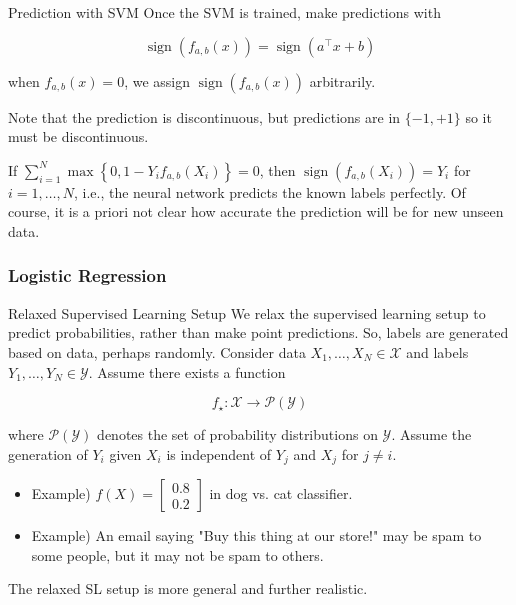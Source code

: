 \begin{frame}[allowframebreaks]

\begin{myconceptblock}{3.7}{Prediction with SVM}
    Once the SVM is trained, make predictions with

    $$
    \operatorname{sign}\left(f_{a, b}(x)\right)=\operatorname{sign}\left(a^{\top} x+b\right)
    $$

    when $f_{a, b}(x)=0$, we assign $\operatorname{sign}\left(f_{a, b}(x)\right)$ arbitrarily.

    Note that the prediction is discontinuous, but predictions are in $\{-1,+1\}$ so it must be discontinuous.

    If $\sum_{i=1}^{N} \max \left\{0,1-Y_{i} f_{a, b}\left(X_{i}\right)\right\}=0$, then $\operatorname{sign}\left(f_{a, b}\left(X_{i}\right)\right)=Y_{i}$ for $i=1, \ldots, N$, i.e., the neural network predicts the known labels perfectly.
    Of course, it is a priori not clear how accurate the prediction will be for new unseen data.
\end{myconceptblock}

\end{frame}

\subsubsection{Logistic Regression}

\begin{frame}[allowframebreaks]

\begin{myconceptblock}{3.8}{Relaxed Supervised Learning Setup}
    We relax the supervised learning setup to predict probabilities, rather than make point predictions.
    So, labels are generated based on data, perhaps randomly.
    Consider data $X_{1}, \ldots, X_{N} \in \mathcal{X}$ and labels $Y_{1}, \ldots, Y_{N} \in \mathcal{Y}$. Assume there exists a function

    $$
    f_{\star}: \mathcal{X} \rightarrow \mathcal{P}(\mathcal{Y})
    $$

    where $\mathcal{P}(\mathcal{Y})$ denotes the set of probability distributions on $\mathcal{Y}$.
    Assume the generation of $Y_{i}$ given $X_{i}$ is independent of $Y_{j}$ and $X_{j}$ for $j \neq i$.

    \begin{itemize}
        \item Example) $f(X)=\left[\begin{array}{l}0.8 \\ 0.2\end{array}\right]$ in dog vs. cat classifier.
        \item Example) An email saying "Buy this thing at our store!" may be spam to some people, but it may not be spam to others.
    \end{itemize}

    The relaxed SL setup is more general and further realistic.
\end{myconceptblock}

\end{frame}

